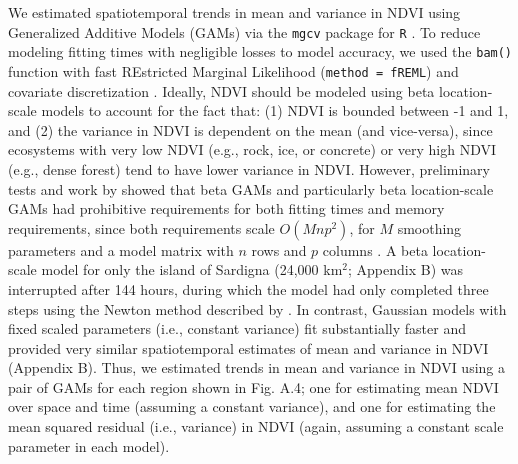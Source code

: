 \documentclass{article}
\begin{document}
We estimated spatiotemporal trends in mean and variance in NDVI using Generalized Additive Models (GAMs) via the \texttt{mgcv} package for \texttt{R} \citep[v. 1.9-3][]{wood_generalized_2017}. To reduce modeling fitting times with negligible losses to model accuracy, we used the \texttt{bam()} function with fast REstricted Marginal Likelihood (\texttt{method = fREML}) and covariate discretization \citep[\texttt{discrete = TRUE}; ][]{wood_generalized_2015, wood_generalized_2017-1}. Ideally, NDVI should be modeled using beta location-scale models \citep[after the linear transformation $Y^*=(Y + 1)/2$; ][]{merder_distributional_2026} to account for the fact that: (1) NDVI is bounded between -1 and 1, and (2) the variance in NDVI is dependent on the mean (and vice-versa), since ecosystems with very low NDVI (e.g., rock, ice, or concrete) or very high NDVI (e.g., dense forest) tend to have lower variance in NDVI. However, preliminary tests and work by \citet{marcus_planning_2025} showed that beta GAMs and particularly beta location-scale GAMs had prohibitive requirements for both fitting times and memory requirements, since both requirements scale $O(Mnp^2)$, for $M$ smoothing parameters and a model matrix with $n$ rows and $p$ columns \citep{wood_generalized_2015}. A beta location-scale model for only the island of Sardigna (24,000 km$^2$; Appendix B) was interrupted after 144 hours, during which the model had only completed three steps using the Newton method described by \citet{wood_generalized_2017-2}. In contrast, Gaussian models with fixed scaled parameters (i.e., constant variance) fit substantially faster and provided very similar spatiotemporal estimates of mean and variance in NDVI (Appendix B). Thus, we estimated trends in mean and variance in NDVI using a pair of GAMs for each region shown in Fig. A.4; one for estimating mean NDVI over space and time (assuming a constant variance), and one for estimating the mean squared residual (i.e., variance) in NDVI (again, assuming a constant scale parameter in each model).
\end{document}
